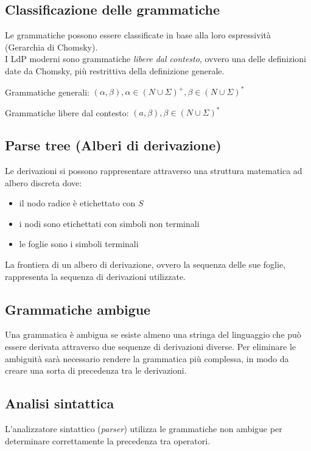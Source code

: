 \documentclass{article}
\begin{document}
\subsection{Classificazione delle grammatiche}
Le grammatiche possono essere classificate in base alla loro espressività (Gerarchia di Chomsky).\\
I LdP moderni sono grammatiche \emph{libere dal contesto}, ovvero una delle definizioni date da Chomsky, più restrittiva della definizione generale.
\begin{dfn}{Grammatiche generali: }
    \((\alpha, \beta), \alpha \in (N \cup \Sigma)^+, \beta \in (N \cup \Sigma)^*\)
\end{dfn}
\begin{dfn}{Grammatiche libere dal contesto: }
    \((a, \beta), \beta \in (N \cup \Sigma)^*\)
\end{dfn}

\subsection{Parse tree (Alberi di derivazione)}
Le derivazioni si possono rappresentare attraverso una struttura matematica ad albero discreta dove:
\begin{itemize}
    \item il nodo radice è etichettato con \(S\)
    \item i nodi sono etichettati con simboli non terminali
    \item le foglie sono i simboli terminali
\end{itemize}

La frontiera di un albero di derivazione, ovvero la sequenza delle sue foglie, rappresenta la sequenza di derivazioni utilizzate.

\subsection{Grammatiche ambigue}
Una grammatica è ambigua se esiste almeno una stringa del linguaggio che può essere derivata attraverso due sequenze di derivazioni diverse.
Per eliminare le ambiguità sarà necessario rendere la grammatica più complessa, in modo da creare una sorta di precedenza tra le derivazioni.

\subsection{Analisi sintattica}
L'analizzatore sintattico (\emph{parser}) utilizza le grammatiche non ambigue per determinare correttamente la precedenza tra operatori.
\end{document}
